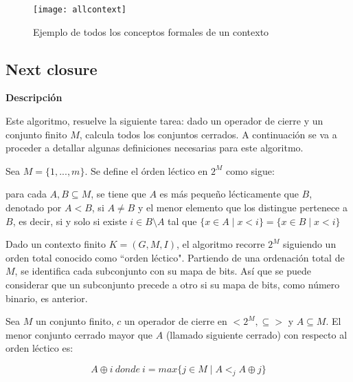         \begin{figure}[H]
            \centering
            \texttt{[image: allcontext]}
            \caption{Ejemplo de todos los conceptos formales de un contexto}
            \label{fig:allcontext}
        \end{figure}

        \clearpage



\subsection{Next closure}

        \textbf{Descripci\'on}

        Este algoritmo, resuelve la siguiente tarea: dado un operador de cierre y un conjunto finito \(M\), calcula todos los 
        conjuntos cerrados. A continuaci\'on se va a proceder a detallar algunas definiciones necesarias para este algoritmo.

        \bigskip

        Sea \(M=\{1, ..., m\}\). Se define el \'orden l\'ectico en \(2^M\) como sigue: 
        
        para cada \(A,B \subseteq M\), se tiene que \(A\) 
        es m\'as peque\~no l\'ecticamente que \(B\), denotado por \(A < B\), si \(A \neq B\) y el menor elemento que los distingue 
        pertenece a \(B\), es decir, si y solo si existe \(i \in B \setminus A \) tal que \( \{x \in A \mid x < i\} = \{x \in B 
        \mid x < i\} \)

        \bigskip

        Dado un contexto finito \( K=(G, M, I) \), el algoritmo recorre \(2^M\) siguiendo un orden total conocido como ``orden l\'ectico". 
        Partiendo de una ordenaci\'on total de \(M\), se identifica cada subconjunto con su mapa de bits. As\'i que se puede considerar 
        que un subconjunto precede a otro si su mapa de bits, como n\'umero binario, es anterior.
    
        \bigskip

        Sea \(M\) un conjunto finito, \(c\) un operador de cierre en \(<2^M, \subseteq > \) y \(A \subseteq M \). El menor 
        conjunto cerrado mayor que \(A\) (llamado siguiente cerrado) con respecto al orden l\'ectico es:

        \[
            A \oplus i ~ donde ~ i = max \{j \in M \mid A <_{j} A \oplus j \}
        \]

        \bigskip

